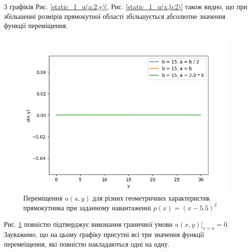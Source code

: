 З графіків Рис. \ref{static_1_u(a:2,y)}, Рис. \ref{static_1_u(x,b:2)} також видно,
що при збільшенні розмірів прямокутної області збільшується абсолютне значення функції переміщення.

\begin{figure}[H]
    \begin{center}
        \includegraphics[width=1\textwidth, scale=0.8]{images/results/static_1/u(a,y).png}
        \caption{Переміщення $u(a, y)$ для різних геометричних характеристик прямокутника при заданному навантаженні $p(x) = (x - 5.5)^2$}\label{static_1_u(a,y)}
    \end{center}
\end{figure}

Рис. \ref{static_1_u(a,y)} повністю підтверджує виконання граничної умови
\newline $u(x,y) |_{x=a}=0$.
Зауважимо, що на цьому графіку присутні всі три значення функції перемеіщення, які повністю накладаються одні на одну.

